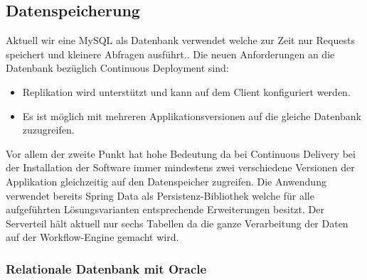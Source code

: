 \subsection{Datenspeicherung}
\label{ent-db}
Aktuell wir eine MySQL als Datenbank verwendet welche zur Zeit nur Requests speichert und kleinere Abfragen ausführt.. Die neuen Anforderungen an die Datenbank bezüglich Continuous Deployment sind:
\begin{itemize}
	\item Replikation wird unterstützt und kann auf dem Client konfiguriert werden.
	\item Es ist möglich mit mehreren Applikationsversionen auf die gleiche Datenbank zuzugreifen.
\end{itemize}
Vor allem der zweite Punkt hat hohe Bedeutung da bei Continuous Delivery bei der Installation der Software immer mindestens zwei verschiedene Versionen der Applikation gleichzeitig auf den Datenspeicher zugreifen. Die Anwendung verwendet bereits Spring Data als Persistenz-Bibliothek welche für alle aufgeführten Lösungsvarianten entsprechende Erweiterungen besitzt. Der Serverteil hält aktuell nur sechs Tabellen da die ganze Verarbeitung der Daten auf der Workflow-Engine gemacht wird.

\subsubsection{Relationale Datenbank mit Oracle}

